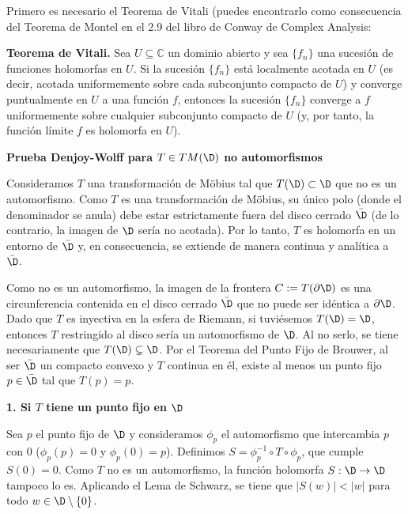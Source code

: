 
\noindent 
 
Primero es necesario el Teorema de Vitali (puedes encontrarlo como consecuencia del Teorema de Montel en el 2.9 del libro de Conway de Complex Analysis: \medskip

\noindent \textbf{Teorema de Vitali.} Sea $U \subseteq \mathbb{C}$ un dominio abierto y sea $\{f_n\}$ una sucesión de funciones holomorfas en $U$. Si la sucesión $\{f_n\}$ está localmente acotada en $U$ (es decir, acotada uniformemente sobre cada subconjunto compacto de $U$) y converge puntualmente en $U$ a una función $f$, entonces la sucesión $\{f_n\}$ converge a $f$ uniformemente sobre cualquier subconjunto compacto de $U$ (y, por tanto, la función límite $f$ es holomorfa en $U$). \bigskip

\noindent \textbf{Prueba Denjoy-Wolff para $T \in TM(\D)$ no automorfismos} \medskip

 Consideramos $T$ una transformación de Möbius tal que $T(\D) \subset \D$ que no es un automorfismo. Como $T$ es una transformación de Möbius, su único polo (donde el denominador se anula) debe estar estrictamente fuera del disco cerrado $\bar{\D}$ (de lo contrario, la imagen de $\D$ sería no acotada). Por lo tanto, $T$ es holomorfa en un entorno de $\bar{\D}$ y, en consecuencia, se extiende de manera continua y analítica a $\bar{\D}$.
 
Como no es un automorfismo, la imagen de la frontera $C := T(\partial \D)$ es una circunferencia contenida en el disco cerrado $\bar{\D}$ que no puede ser idéntica a $\partial \D$. Dado que $T$ es inyectiva en la esfera de Riemann, si tuviésemos $T(\D) = \D$, entonces $T$ restringido al disco sería un automorfismo de $\D$. Al no serlo, se tiene necesariamente que $T(\D) \subsetneq \D$. Por el Teorema del Punto Fijo de Brouwer, al ser $\bar{\D}$ un compacto convexo y $T$ continua en él, existe al menos un punto fijo $p \in \bar{\D}$ tal que $T(p)=p$.

\medskip

\noindent \textbf{1. Si $T$ tiene un punto fijo en $\D$}

\medskip 

\noindent Sea $p$ el punto fijo de $\D$ y consideramos $\phi_p$ el automorfismo que intercambia $p$ con $0$ ($\phi_p(p)=0$ y $\phi_p(0)=p$). Definimos $S=\phi_p^{-1} \circ T \circ \phi_p$, que cumple $S(0)=0$. Como $T$ no es un automorfismo, la función holomorfa $S: \D \to \D$ tampoco lo es. Aplicando el Lema de Schwarz, se tiene que $|S(w)| < |w|$ para todo $w \in \D\setminus\{0\}$.

